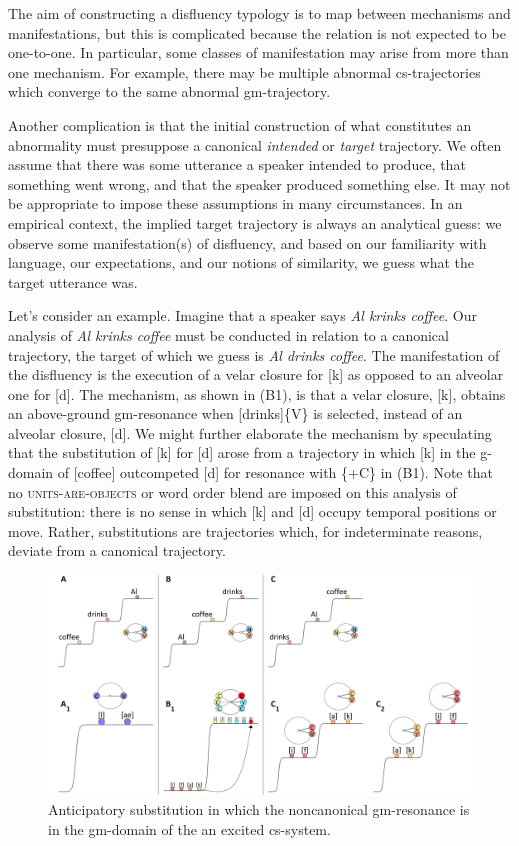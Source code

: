   The aim of constructing a disfluency typology is to map between mechanisms and manifestations, but this is complicated because the relation is not expected to be one-to-one. In particular, some classes of manifestation may arise from more than one mechanism. For example, there may be multiple abnormal cs-trajectories which converge to the same abnormal gm-trajectory. 

  Another complication is that the initial construction of what constitutes an abnormality must presuppose a canonical \textit{intended} or \textit{target} trajectory. We often assume that there was some utterance a speaker intended to produce, that something went wrong, and that the speaker produced something else. It may not be appropriate to impose these assumptions in many circumstances. In an empirical context, the implied target trajectory is always an analytical guess: we observe some manifestation(s) of disfluency, and based on our familiarity with language, our expectations, and our notions of similarity, we guess what the target utterance was.

  Let's consider an example. Imagine that a speaker says \textit{Al krinks coffee}. Our analysis of \textit{Al krinks coffee} must be conducted in relation to a canonical trajectory, the target of which we guess is \textit{Al drinks coffee}. The manifestation of the disfluency is the execution of a velar closure for [k] as opposed to an alveolar one for [d]. The mechanism, as shown in {}(B1), is that a velar closure, [k], obtains an above-ground gm-resonance when [drinks]\{V\} is selected, instead of an alveolar closure, [d]. We might further elaborate the mechanism by speculating that the substitution of [k] for [d] arose from a trajectory in which [k] in the g-domain of [coffee] outcompeted [d] for resonance with \{+C\} in (B1). Note that no \textsc{units}\textsc{{}-are-}\textsc{objects} or word order blend are imposed on this analysis of substitution: there is no sense in which [k] and [d] occupy temporal positions or move. Rather, substitutions are trajectories which, for indeterminate reasons, deviate from a canonical trajectory. 

  
\begin{figure}
\includegraphics[width=\textwidth]{figures/Tilsen-img58.png}
\caption{Anticipatory substitution in which the noncanonical gm-resonance is in the gm-domain of the an excited cs-system.}
\label{fig:4:8a}
\end{figure}
 

